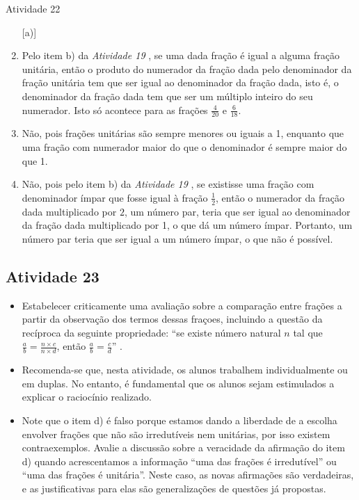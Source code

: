 \documentclass[oneside]{book}
\begin{document}
\begin{multicols}{2}
\begin{resposta*}{Atividade 22}
\begin{enumerate} [\quad a)] %
    \item       Pelo item b) da \emph{Atividade 19}      , se uma dada fração é 
igual a alguma fração unitária, então o produto do numerador da fração dada pelo 
denominador da fração unitária tem que ser igual ao denominador da fração dada, 
isto é, o denominador da fração dada tem que ser um múltiplo inteiro do seu 
numerador. Isto só acontece para as frações       $\frac{4}{20}$       e       
$\frac{6}{18}$.
    \item       Não, pois frações unitárias são sempre menores ou iguais a 1, 
enquanto que uma fração com numerador maior do que o denominador é sempre maior 
do que 1.
    \item       Não, pois pelo item b) da \emph{Atividade 19}      , se 
existisse uma fração com denominador ímpar que fosse igual à fração       
$\frac{1}{2}$, então o numerador da fração dada multiplicado por       $2$, um 
número par, teria que ser igual ao denominador da fração dada multiplicado por 
1, o que dá um número ímpar. Portanto, um número par teria que ser igual a um 
número ímpar, o que não é possível. 
\end{enumerate} %
  
\end{resposta*}


\subsection{Atividade 23}

\begin{itemize} %
  \item     Estabelecer criticamente uma avaliação sobre a comparação entre 
frações a partir da observação dos termos dessas fraçoes, incluindo a questão da 
recíproca da seguinte propriedade:     ``se existe número natural $n$ tal que 
$\frac{a}{b} = \frac{n \times c}{n \times d}$, então $\frac{a}{b} = 
\frac{c}{d}$''    . 
\end{itemize} %


\begin{itemize} %
  \item     Recomenda-se que, nesta atividade, os alunos trabalhem 
individualmente ou em duplas. No entanto, é fundamental que os alunos sejam 
estimulados a explicar o raciocínio realizado.
  \item     Note que o item d) é falso porque estamos dando a liberdade de a 
escolha envolver frações que não são irredutíveis nem unitárias, por isso 
existem contraexemplos. Avalie a discussão sobre a veracidade da afirmação do 
item d) quando acrescentamos a informação ``uma das frações é irredutível'' ou 
``uma das frações é unitária''. Neste caso, as novas afirmações são verdadeiras, 
e as justificativas para elas são generalizações de questões já propostas.
\end{itemize} %


\end{multicols}
\end{document}
